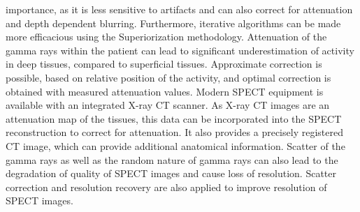 \documentclass{article}
\begin{document}
importance, as it is less sensitive to artifacts and can also correct for attenuation and depth dependent blurring. Furthermore, iterative algorithms can be made more efficacious using the Superiorization methodology. Attenuation of the gamma rays within the patient can lead to significant underestimation of activity in deep tissues, compared to superficial tissues. Approximate correction is possible, based on relative position of the activity, and optimal correction is obtained with measured attenuation values. Modern SPECT equipment is available with an integrated X-ray CT scanner. As X-ray CT images are an attenuation map of the tissues, this data can be incorporated into the SPECT reconstruction to correct for attenuation. It also provides a precisely registered CT image, which can provide additional anatomical information. Scatter of the gamma rays as well as the random nature of gamma rays can also lead to the degradation of quality of SPECT images and cause loss of resolution. Scatter correction and resolution recovery are also applied to improve resolution of SPECT images.
\end{document}
